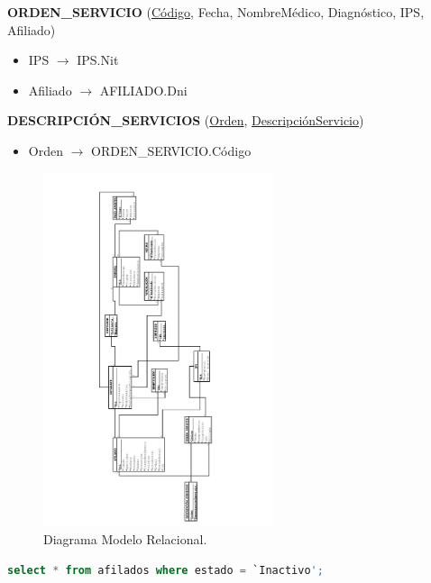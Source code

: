 \documentclass[12pt,a4paper]{article}
\begin{document}
\begin{tcolorbox}
\textbf{ORDEN\_SERVICIO} (\underline{Código}, Fecha, NombreMédico, Diagnóstico, IPS, Afiliado)
\begin{itemize}
\item IPS $\rightarrow$ IPS.Nit
\item Afiliado $\rightarrow$ AFILIADO.Dni
\end{itemize}
\textbf{DESCRIPCIÓN\_SERVICIOS} (\underline{Orden}, \underline{DescripciónServicio})
\begin{itemize}
\item Orden $\rightarrow$ ORDEN\_SERVICIO.Código
\end{itemize}
\end{tcolorbox}
\begin{figure}[H]
\centering
{\includegraphics[width=0.6\textwidth, angle=-90]{RelationalModel.pdf}\par}
\caption{Diagrama Modelo Relacional.}
\end{figure}
\begin{tcolorbox}[title=Consultas SQL]
\begin{lstlisting}[language=SQL]
select * from afilados where estado = `Inactivo';
\end{lstlisting}
\end{tcolorbox}
\end{document}
